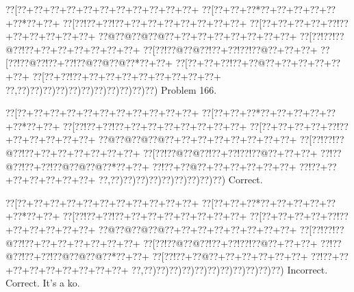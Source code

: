 \documentclass[a5paper]{article}
\begin{document}
\newpage
\begin{center}
{\goo
\0??[\0??+\0??+\0??+\0??+\0??+\0??+\0??+\0??+\0??+\0??+\0??+
\0??[\0??+\0??+\0??*\0??+\0??+\0??+\0??+\0??+\0??*\0??+\0??+
\0??[\0??!\0??+\0??!\0??+\0??+\0??+\0??+\0??+\0??+\0??+\0??+
\0??[\0??+\0??+\0??+\0??+\0??!\0??+\0??+\0??+\0??+\0??+\0??+
\0??@\0??@\0??@\0??@\0??+\0??+\0??+\0??+\0??+\0??+\0??+\0??+
\0??[\0??!\0??!\0??@\0??!\0??+\0??+\0??+\0??+\0??+\0??+\0??+
\0??[\0??!\0??@\0??@\0??!\0??+\0??!\0??!\0??@\0??+\0??+\0??+
\0??[\0??!\0??@\0??!\0??+\0??!\0??@\0??@\0??@\0??*\0??+\0??+
\0??[\0??+\0??+\0??!\0??+\0??@\0??+\0??+\0??+\0??+\0??+\0??+
\0??[\0??+\0??!\0??+\0??+\0??+\0??+\0??+\0??+\0??+\0??+\0??+
\0??,\0??)\0??)\0??)\0??)\0??)\0??)\0??)\0??)\0??)\0??)\0??)
}
Problem 166.

\end{center}
\begin{center}
{\goo
\0??[\0??+\0??+\0??+\0??+\0??+\0??+\0??+\0??+\0??+\0??+\0??+
\0??[\0??+\0??+\0??*\0??+\0??+\0??+\0??+\0??+\0??*\0??+\0??+
\0??[\0??!\0??+\0??!\0??+\0??+\0??+\0??+\0??+\0??+\0??+\0??+
\0??[\0??+\0??+\0??+\0??+\0??!\0??+\0??+\0??+\0??+\0??+\0??+
\0??@\0??@\0??@\0??@\0??+\0??+\0??+\0??+\0??+\0??+\0??+\0??+
\0??[\0??!\0??!\0??@\0??!\0??+\0??+\0??+\0??+\0??+\0??+\0??+
\0??[\0??!\0??@\0??@\0??!\0??+\0??!\0??!\0??@\0??+\0??+\0??+
\0??!\0??@\0??!\0??+\0??!\0??@\0??@\0??@\0??*\0??+\0??+
\0??!\0??+\0??@\0??+\0??+\0??+\0??+\0??+\0??+
\0??!\0??+\0??+\0??+\0??+\0??+\0??+\0??+
\0??,\0??)\0??)\0??)\0??)\0??)\0??)\0??)\0??)\0??)
}
Correct. 

\end{center}
\begin{center}
{\goo
\0??[\0??+\0??+\0??+\0??+\0??+\0??+\0??+\0??+\0??+\0??+\0??+
\0??[\0??+\0??+\0??*\0??+\0??+\0??+\0??+\0??+\0??*\0??+\0??+
\0??[\0??!\0??+\0??!\0??+\0??+\0??+\0??+\0??+\0??+\0??+\0??+
\0??[\0??+\0??+\0??+\0??+\0??!\0??+\0??+\0??+\0??+\0??+\0??+
\0??@\0??@\0??@\0??@\0??+\0??+\0??+\0??+\0??+\0??+\0??+\0??+
\0??[\0??!\0??!\0??@\0??!\0??+\0??+\0??+\0??+\0??+\0??+\0??+
\0??[\0??!\0??@\0??@\0??!\0??+\0??!\0??!\0??@\0??+\0??+\0??+
\0??!\0??@\0??!\0??+\0??!\0??@\0??@\0??@\0??*\0??+\0??+
\0??[\0??!\0??+\0??@\0??+\0??+\0??+\0??+\0??+\0??+
\0??!\0??+\0??+\0??+\0??+\0??+\0??+\0??+\0??+\0??+
\0??,\0??)\0??)\0??)\0??)\0??)\0??)\0??)\0??)\0??)\0??)\0??)
}
Incorrect. Correct. It's a ko.

\end{center}
\end{document}

